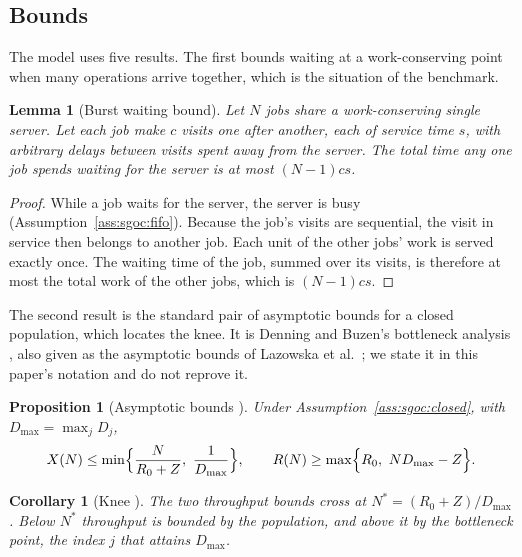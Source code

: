 \documentclass[11pt,letterpaper]{article}
\newtheorem{proposition}[theorem]{Proposition}
\newtheorem{lemma}[theorem]{Lemma}
\newtheorem{corollary}[theorem]{Corollary}
\theoremstyle{definition}
\theoremstyle{remark}
\begin{document}
\subsection{Bounds}

The model uses five results. The first bounds waiting at a work-conserving point when many operations arrive together, which is the situation of the benchmark.

\begin{lemma}[Burst waiting bound]
\label{lem:sgoc:burst}
Let $N$ jobs share a work-conserving single server. Let each job make $c$ visits one after another, each of service time $s$, with arbitrary delays between visits spent away from the server. The total time any one job spends waiting for the server is at most $(N-1)cs$.
\end{lemma}

\begin{proof}
While a job waits for the server, the server is busy (Assumption~\ref{ass:sgoc:fifo}). Because the job's visits are sequential, the visit in service then belongs to another job. Each unit of the other jobs' work is served exactly once. The waiting time of the job, summed over its visits, is therefore at most the total work of the other jobs, which is $(N-1)cs$.
\end{proof}

The second result is the standard pair of asymptotic bounds for a closed population, which locates the knee. It is Denning and Buzen's bottleneck analysis \cite{denning1978operational}, also given as the asymptotic bounds of Lazowska et al.\ \cite{lazowska1984qsp}; we state it in this paper's notation and do not reprove it.

\begin{proposition}[Asymptotic bounds {\cite[Section~4]{denning1978operational}}]
\label{prop:sgoc:throughput-bound}
Under Assumption~\ref{ass:sgoc:closed}, with $D_{\max} = \max_j D_j$,
\begin{equation}
\label{eq:sgoc:bounds}
X(N) \le \min\Bigl\{\frac{N}{R_0 + Z},\ \frac{1}{D_{\max}}\Bigr\},
\qquad
R(N) \ge \max\Bigl\{R_0,\ N D_{\max} - Z\Bigr\}.
\end{equation}
\end{proposition}

\begin{corollary}[Knee {\cite[Section~4]{denning1978operational}}]
\label{cor:sgoc:knee}
The two throughput bounds cross at $N^{*} = (R_0 + Z)/D_{\max}$. Below $N^{*}$ throughput is bounded by the population, and above it by the bottleneck point, the index $j$ that attains $D_{\max}$.
\end{corollary}
\end{document}
